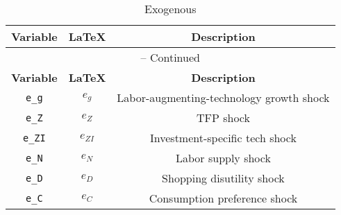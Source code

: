 \begin{center}
\begin{longtable}{ccc}
\caption{Exogenous}\\%
\hline%
\multicolumn{1}{c}{\textbf{Variable}} &
\multicolumn{1}{c}{\textbf{\LaTeX}} &
\multicolumn{1}{c}{\textbf{Description}}\\%
\hline\hline%
\endfirsthead
\multicolumn{3}{c}{{\tablename} \thetable{} -- Continued}\\%
\hline%
\multicolumn{1}{c}{\textbf{Variable}} &
\multicolumn{1}{c}{\textbf{\LaTeX}} &
\multicolumn{1}{c}{\textbf{Description}}\\%
\hline\hline%
\endhead
\texttt{e\_g} & ${e_g}$ & Labor-augmenting-technology growth shock\\
\texttt{e\_Z} & ${e_Z}$ & TFP shock\\
\texttt{e\_ZI} & ${e_{ZI}}$ & Investment-specific tech shock\\
\texttt{e\_N} & ${e_N}$ & Labor supply shock\\
\texttt{e\_D} & ${e_D}$ & Shopping disutility shock\\
\texttt{e\_C} & ${e_C}$ & Consumption preference shock\\
\hline%
\end{longtable}
\end{center}
